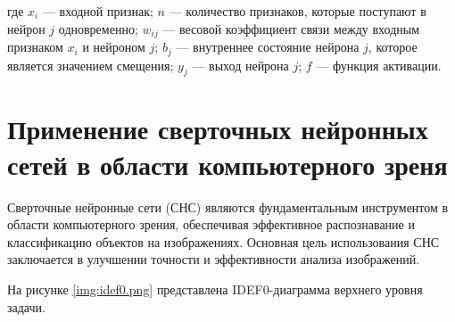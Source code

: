 	где \(x_i\) --- входной признак; \(n\) --- количество признаков, которые поступают в нейрон \(j\) одновременно; \(w_{ij}\) --- весовой коэффициент связи между входным признаком \(x_i\) и нейроном \(j\); \(b_j\) --- внутреннее состояние нейрона \(j\), которое является значением смещения; \(y_j\) --- выход нейрона \(j\); \(f\) --- функция активации.


\section{Применение сверточных нейронных сетей в области компьютерного зреня}

Сверточные нейронные сети (СНС) являются фундаментальным инструментом в области компьютерного зрения, обеспечивая эффективное распознавание и классификацию объектов на изображениях. Основная цель использования СНС заключается в улучшении точности и эффективности анализа изображений.

На рисунке \ref{img:idef0.png} представлена IDEF0-диаграмма верхнего уровня задачи.


	

